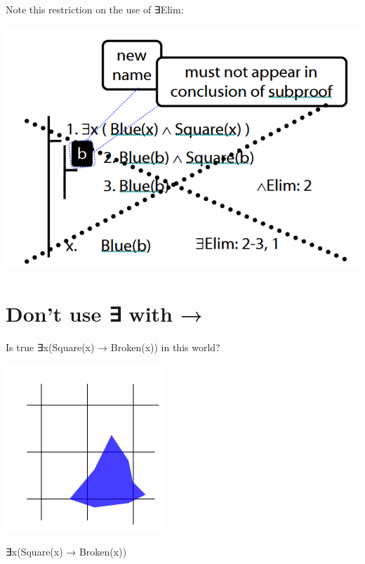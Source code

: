 \documentclass[12pt]{extarticle}
\begin{document}
\begin{multicols*}{3}
\begin{minipage}{\columnwidth}
Note this restriction on the use of ∃Elim:
 
\begin{center}
\includegraphics[scale=0.3]{img/proof_existential_elim_incorrect.png}
\end{center}
\end{minipage}
 
 
 
\section{Don't use ∃ with →}
 
\begin{minipage}{\columnwidth}
 
Is true ∃x(Square(x) → Broken(x)) in this world?
 
\begin{center}
\includegraphics[scale=0.3]{img/word_02.png}
\end{center}
\end{minipage}
 
∃x(Square(x) → Broken(x))
 

\end{multicols*}
\end{document}
